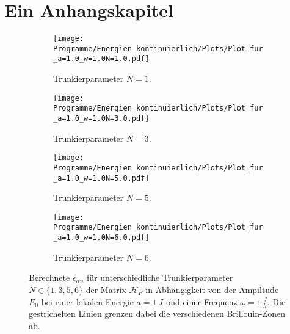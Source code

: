 \chapter{Ein Anhangskapitel}
\begin{figure}
  \centering
  \begin{subfigure}{0.48\textwidth}
    \texttt{[image: Programme/Energien\_kontinuierlich/Plots/Plot\_fur\_a=1.0\_w=1.0N=1.0.pdf]}
    \caption{Trunkierparameter $N=1$.}
    \label{fig=N_1}
  \end{subfigure}
  \begin{subfigure}{0.48\textwidth}
    \texttt{[image: Programme/Energien\_kontinuierlich/Plots/Plot\_fur\_a=1.0\_w=1.0N=3.0.pdf]}
    \caption{Trunkierparameter $N=3.$}
    \label{fig=N_3}
  \end{subfigure}
  \begin{subfigure}{0.48\textwidth}
    \texttt{[image: Programme/Energien\_kontinuierlich/Plots/Plot\_fur\_a=1.0\_w=1.0N=5.0.pdf]}
    \caption{Trunkierparameter $N=5$.}
    \label{fig=N_5}
  \end{subfigure}
  \begin{subfigure}{0.48\textwidth}
    \texttt{[image: Programme/Energien\_kontinuierlich/Plots/Plot\_fur\_a=1.0\_w=1.0N=6.0.pdf]}
    \caption{Trunkierparameter $N=6$.}
    \label{fig=N_6}
  \end{subfigure}
  \caption{Berechnete $\epsilon_{\alpha n}$ für unterschiedliche
  Trunkierparameter $N\in\{1,3,5,6\}$
  der Matrix $\mathcal{H}_F$ in Abhängigkeit von der Ampiltude $E_0$
  bei einer lokalen Energie $a=1\,J$ und einer Frequenz
  $\omega=1\,\frac{J}{\hbar}$. Die gestrichelten Linien grenzen dabei
  die verschiedenen Brillouin-Zonen ab.}
  \label{fig:brillouin}
\end{figure}





